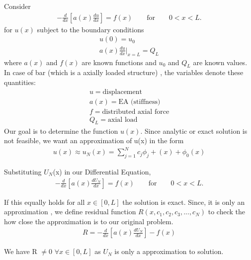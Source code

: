 Consider\\
\begin{eqnarray}
	-\frac{d}{dx} \left[a(x)\frac{du}{dx} \right] = f(x)  \quad\quad  \text{for} \quad\quad  0<x<L.
\end{eqnarray}
for $u(x)$ subject to the boundary conditions\\
\begin{eqnarray}
	u(0)= u_0 \\
	a(x)\frac{du}{dx}\biggr|_{x=L} = Q_L	
\end{eqnarray}
where $a(x)$ and $f(x)$ are known functions and 
$u_0$ and $Q_L$ are known values.
In case of bar (which is a axially loaded structure) , the variables denote these quantities:
\begin{eqnarray*}
	u = \text{displacement}\\
	a(x)= \text{EA (stiffness)}\\
	f = \text{distributed axial force}\\
	Q_L= \text{axial load}
\end{eqnarray*}
Our goal is to determine the function $u(x)$. Since analytic or exact solution is not feasible, we want an approximation of u(x) in the form
\begin{eqnarray}\label{approxfunc}\label{approxsoln}
	u(x)\approx u_N(x) = \sum\limits_{j=1}^N c_j\phi_{j} + (x) +\phi_{0}(x)
\end{eqnarray}


 Substituting  $U_N$(x) in our Differential Equation, 
 \begin{eqnarray}
 	-\frac{d}{dx} \left[a(x)\frac{dU_N}{dx} \right] = f(x)  \quad\quad  \text{for} \quad\quad  0<x<L.
 \end{eqnarray}

If this equally holds for all $x \in [0,L] $ the solution is exact. Since, it is only an approximation , we define residual function $R(x,c_1, c_2, c_3,...,c_N)$ to check the how close the approximation is to our original problem.
\begin{eqnarray}
	R = -\frac{d}{dx} \left[a(x)\frac{dU_N}{dx} \right] - f(x)
\end{eqnarray} 

We have R $\neq$0 $ \forall x  \in [0, L]$  as $U_N$ is only a approximation to solution.
\pagebreak

